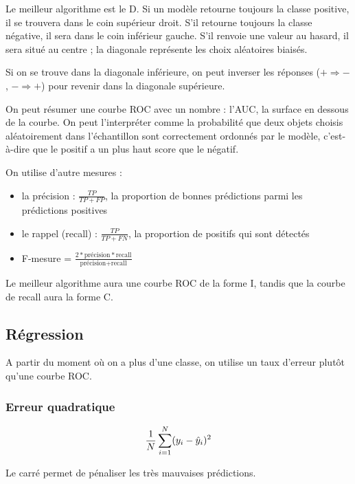 	Le meilleur algorithme est le D. Si un modèle retourne toujours la classe positive, il se trouvera dans le coin supérieur droit. S'il retourne toujours la classe négative, il sera dans le coin inférieur gauche. S'il renvoie une valeur au hasard, il sera situé au centre ; la diagonale représente les choix aléatoires biaisés.
	
	Si on se trouve dans la diagonale inférieure, on peut inverser les réponses ($+ \Rightarrow -$, $- \Rightarrow +$) pour revenir dans la diagonale supérieure.
	
	
	On peut résumer une courbe ROC avec un nombre : l'AUC, la surface en dessous de la courbe. On peut l'interpréter comme la probabilité que deux objets choisis aléatoirement dans l'échantillon sont correctement ordonnés par le modèle, c'est-à-dire que le positif a un plus haut score que le négatif.
	
	On utilise d'autre mesures :
	
	\begin{itemize}
		\item la précision : $\frac{TP}{TP + FP}$, la proportion de bonnes prédictions parmi les prédictions positives
		\item le rappel (recall) : $\frac{TP}{TP + FN}$, la proportion de positifs qui sont détectés
		\item F-mesure = $\frac{2 * \text{précision} * \text{recall}}{\text{précision} + \text{recall}}$
	\end{itemize}
	
	
	Le meilleur algorithme aura une courbe ROC de la forme {\pigpenfont I}, tandis que la courbe de recall aura la forme {\pigpenfont C}.
	
	\subsection{Régression}
	
		A partir du moment où on a plus d'une classe, on utilise un taux d'erreur plutôt qu'une courbe ROC.
	
		\subsubsection{Erreur quadratique}
		
		$$\frac{1}{N} \sum_{i = 1}^N (y_i - \hat{y}_i)^2$$
		
		Le carré permet de pénaliser les très mauvaises prédictions.
		
